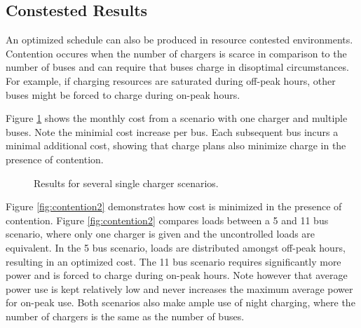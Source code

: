 \subsection{Constested Results}
An optimized schedule can also be produced in resource contested environments. Contention occures when the number of chargers is scarce in comparison to the number of buses and can require that buses charge in disoptimal circumstances.  For example, if charging resources are saturated during off-peak hours, other buses might be forced to charge during on-peak hours. 
\par Figure \ref{fig:contention1} shows the monthly cost from a scenario with one charger and multiple buses. Note the minimial cost increase per bus.  Each subsequent bus incurs a minimal additional cost, showing that charge plans also minimize charge in the presence of contention.
\begin{figure}
	\caption{Results for several single charger scenarios.}
	\label{fig:contention1}
\end{figure}
\par Figure \ref{fig:contention2} demonstrates how cost is minimized in the presence of contention. Figure \ref{fig:contention2} compares loads between a 5 and 11 bus scenario, where only one charger is given and the uncontrolled loads are equivalent. In the 5 bus scenario, loads are distributed amongst off-peak hours, resulting in an optimized cost.  The 11 bus scenario requires significantly more power and is forced to charge during on-peak hours.  Note however that average power use is kept relatively low and never increases the maximum average power for on-peak use. Both scenarios also make ample use of night charging, where the number of chargers is the same as the number of buses.  
\begin{figure*}
	\centering
	\caption{Comparison of the loads for a 5 and 11 bus scenario with one overhead charger} 
	\label{fig:contention2}
\end{figure*}

